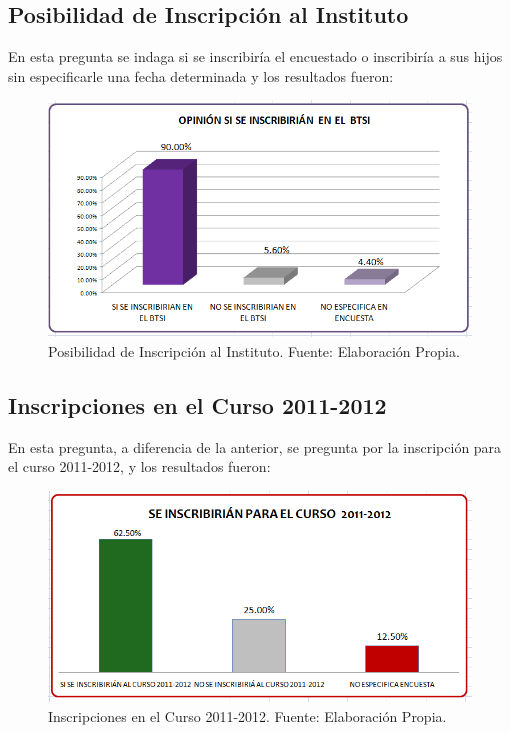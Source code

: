 

\clearpage
\subsection{Posibilidad de Inscripción al Instituto}

En esta pregunta se indaga si se inscribiría el encuestado o inscribiría a sus hijos sin especificarle una fecha determinada y los resultados fueron:

\begin{figure}[h!]
	\centering
	\includegraphics[scale=0.5]{images/encuesta_aceptacion}
	\caption{Posibilidad de Inscripción al Instituto. Fuente: Elaboración Propia.}
	\label{fig:Encuesta:Aceptacion}
\end{figure}



\clearpage
\subsection{Inscripciones en el Curso 2011-2012}

En esta pregunta, a diferencia de la anterior, se pregunta por la inscripción para el curso 2011-2012, y los resultados fueron:

\begin{figure}[h!]
	\centering
	\includegraphics[scale=0.5]{images/encuesta_inscripciones_2011}
	\caption{Inscripciones en el Curso 2011-2012. Fuente: Elaboración Propia.}
	\label{fig:Encuesta:Inscripciones2011}
\end{figure}

